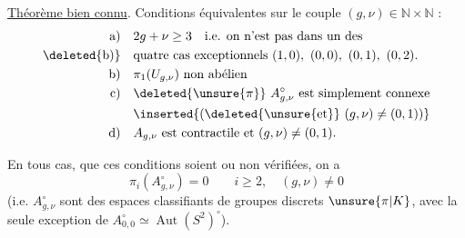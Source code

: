 

\uline{Théorème bien connu}. Conditions équivalentes sur le couple $(g,\nu)\in\mathbb N\times\mathbb N$ :
\[
\begin{aligned}
\text{a)}\quad &2g+\nu\geq3\quad\text{i.e. on n'est pas dans un des}\\
\text{\deleted{b)}}\quad &\text{quatre cas exceptionnels }(1,0),\ (0,0),\ (0,1),\ (0,2).\\
\text{b)}\quad &\pi_1(U_{g,\nu})\text{ non abélien}\\
\text{c)}\quad &\deleted{\unsure{\pi}}\ A_{g,\nu}^{\circ}\text{ est simplement connexe}\\
&\inserted{\text{(}\deleted{\unsure{\text{et}}}\ (g,\nu)\ne(0,1)\text{)}}\\
\text{d)}\quad &A_{g,\nu}\text{ est contractile et }(g,\nu)\ne(0,1).
\end{aligned}
\]

En tous cas, que ces conditions soient ou non vérifiées, on a 
\[
\pi_i(A_{g,\nu}^{\circ})=0\qquad i\geq2,\quad(g,\nu)\ne0
\]
(i.e.  $A_{g,\nu}^{\circ}$ sont des espaces classifiants de groupes discrets $\unsure{\pi|K}$, avec la seule exception de $A_{0,0}^{\circ}\simeq\operatorname{Aut}(S^2)^{\circ}$).

